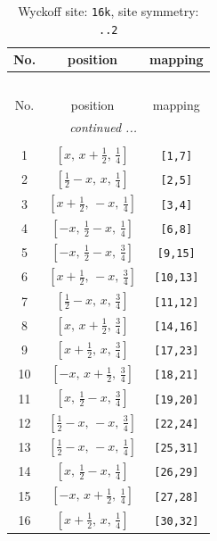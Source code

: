 \documentclass[fleqn,8pt]{jsarticle}
\begin{document}
\begin{longtable}{ccc}
\caption{Wyckoff site: {\tt 16k}, site symmetry: {\tt ..2}}
 \\
 \hline \hline
No. & position & mapping \\ \hline \endfirsthead

\multicolumn{2}{l}{\tablename\ \thetable{}} \\
 \hline \hline
No. & position & mapping \\ \hline \endhead

 \hline \hline
\multicolumn{2}{r}{\footnotesize\it continued ...} \\ \endfoot

 \hline \hline
\multicolumn{2}{r}{} \\ \endlastfoot

1 & $\left[ x,\, x + \frac{1}{2},\, \frac{1}{4} \right]$ & {\tt [1,7]} \\ \hline
2 & $\left[ \frac{1}{2} - x,\, x,\, \frac{1}{4} \right]$ & {\tt [2,5]} \\ \hline
3 & $\left[ x + \frac{1}{2},\, - x,\, \frac{1}{4} \right]$ & {\tt [3,4]} \\ \hline
4 & $\left[ - x,\, \frac{1}{2} - x,\, \frac{1}{4} \right]$ & {\tt [6,8]} \\ \hline
5 & $\left[ - x,\, \frac{1}{2} - x,\, \frac{3}{4} \right]$ & {\tt [9,15]} \\ \hline
6 & $\left[ x + \frac{1}{2},\, - x,\, \frac{3}{4} \right]$ & {\tt [10,13]} \\ \hline
7 & $\left[ \frac{1}{2} - x,\, x,\, \frac{3}{4} \right]$ & {\tt [11,12]} \\ \hline
8 & $\left[ x,\, x + \frac{1}{2},\, \frac{3}{4} \right]$ & {\tt [14,16]} \\ \hline
9 & $\left[ x + \frac{1}{2},\, x,\, \frac{3}{4} \right]$ & {\tt [17,23]} \\ \hline
10 & $\left[ - x,\, x + \frac{1}{2},\, \frac{3}{4} \right]$ & {\tt [18,21]} \\ \hline
11 & $\left[ x,\, \frac{1}{2} - x,\, \frac{3}{4} \right]$ & {\tt [19,20]} \\ \hline
12 & $\left[ \frac{1}{2} - x,\, - x,\, \frac{3}{4} \right]$ & {\tt [22,24]} \\ \hline
13 & $\left[ \frac{1}{2} - x,\, - x,\, \frac{1}{4} \right]$ & {\tt [25,31]} \\ \hline
14 & $\left[ x,\, \frac{1}{2} - x,\, \frac{1}{4} \right]$ & {\tt [26,29]} \\ \hline
15 & $\left[ - x,\, x + \frac{1}{2},\, \frac{1}{4} \right]$ & {\tt [27,28]} \\ \hline
16 & $\left[ x + \frac{1}{2},\, x,\, \frac{1}{4} \right]$ & {\tt [30,32]} \\
\end{longtable}
\end{document}
